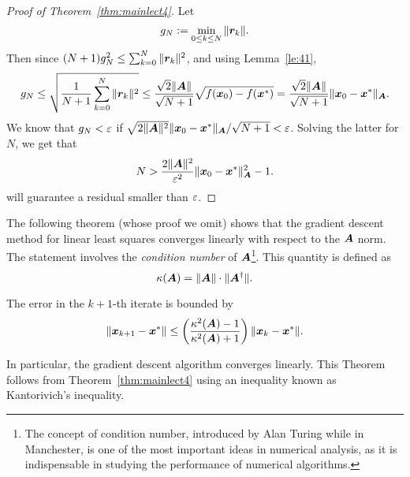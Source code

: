 \begin{proof}[Proof of Theorem~\ref{thm:mainlect4}]
Let
 \begin{equation*}
 g_N := \min_{0\leq k\leq N} \Vert {\bm{r}_k}\Vert.
\end{equation*}
Then since $(N+1)g_N^2\leq \sum_{k=0}^N \Vert {\bm{r}_k}\Vert^2$, and using Lemma~\ref{le:41},
\begin{equation*}
 g_N \leq \sqrt{\frac{1}{N+1}\sum_{k=0}^N \Vert {\bm{r}_k}\Vert^2} \leq \frac{\sqrt{2}\Vert {\bm{A}}\Vert}{\sqrt{N+1}}\sqrt{f(\bm{x}_0)-f(\bm{x}^*)}=\frac{\sqrt{2}\Vert {\bm{A}}\Vert}{\sqrt{N+1}}\Vert {\bm{x}_0-\bm{x}^*}\Vert_{\bm{A}}.
\end{equation*}
We know that $g_N< \varepsilon$ if $\sqrt{2\Vert {\bm{A}}\Vert^2}\Vert {\bm{x}_0-\bm{x}^*}\Vert_{\bm{A}}/\sqrt{N+1}<\varepsilon$. Solving the latter for $N$, we get that
\begin{equation*}
 N> \frac{2\Vert {\bm{A}}\Vert^2}{\varepsilon^2}\Vert {\bm{x}_0-\bm{x}^*}\Vert_{\bm{A}}^2-1.
\end{equation*}
will guarantee a residual smaller than $\varepsilon$.
\end{proof}

The following theorem (whose proof we omit) shows that the gradient descent method for linear least squares converges linearly with respect to the $\bm{A}$ norm. The statement involves the {\em condition number} of $\bm{A}$\footnote{The concept of condition number, introduced by Alan Turing while in Manchester, is one of the most important ideas in numerical analysis, as it is indispensable in studying the performance of numerical algorithms.}. This quantity is defined as
\begin{equation*}
 \kappa(\bm{A}) = \Vert {\bm{A}}\Vert\cdot \Vert {\bm{A}^{\dagger}}\Vert.
\end{equation*}

\begin{theorem}
 The error in the $k+1$-th iterate is bounded by
 \begin{equation*}
  \Vert {\bm{x}_{k+1}-\bm{x}^*}\Vert \leq \left(\frac{\kappa^2(\bm{A})-1}{\kappa^2(\bm{A})+1}\right)\Vert {\bm{x}_{k}-\bm{x}^*}\Vert.
 \end{equation*}
\end{theorem}

In particular, the gradient descent algorithm converges linearly. This Theorem follows from Theorem~\ref{thm:mainlect4} using an inequality known as Kantorivich's inequality.

